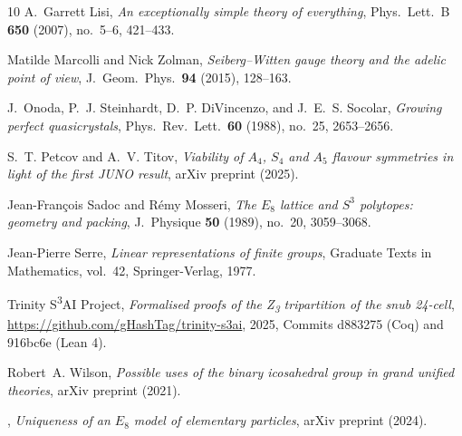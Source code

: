 \documentclass[10pt,reqno]{amsart}
\theoremstyle{plain}
\theoremstyle{definition}
\begin{document}
\begin{thebibliography}{10}
A.~Garrett Lisi, \emph{An exceptionally simple theory of everything}, Phys.\
  Lett.\ B \textbf{650} (2007), no.~5--6, 421--433.

Matilde Marcolli and Nick Zolman, \emph{Seiberg--{W}itten gauge theory and the
  adelic point of view}, J.\ Geom.\ Phys.\ \textbf{94} (2015), 128--163.

J.~Onoda, P.~J. Steinhardt, D.~P. DiVincenzo, and J.~E.~S. Socolar,
  \emph{Growing perfect quasicrystals}, Phys.\ Rev.\ Lett.\ \textbf{60} (1988),
  no.~25, 2653--2656.

S.~T. Petcov and A.~V. Titov, \emph{Viability of {$A_4$}, {$S_4$} and {$A_5$}
  flavour symmetries in light of the first {JUNO} result}, arXiv preprint
  (2025).

Jean-Fran\c{c}ois Sadoc and R\'{e}my Mosseri, \emph{The {$E_8$} lattice and
  {$S^3$} polytopes: geometry and packing}, J.\ Physique \textbf{50} (1989),
  no.~20, 3059--3068.

Jean-Pierre Serre, \emph{Linear representations of finite groups}, Graduate
  Texts in Mathematics, vol.~42, Springer-Verlag, 1977.

{Trinity S\textsuperscript{3}AI Project}, \emph{Formalised proofs of the
  {Z\textsubscript{3}} tripartition of the snub 24-cell},
  \url{https://github.com/gHashTag/trinity-s3ai}, 2025, Commits d883275 (Coq)
  and 916bc6e (Lean 4).

Robert~A. Wilson, \emph{Possible uses of the binary icosahedral group in grand
  unified theories}, arXiv preprint (2021).

\bysame, \emph{Uniqueness of an {$E_8$} model of elementary particles}, arXiv
  preprint (2024).

\end{thebibliography}
\end{document}
